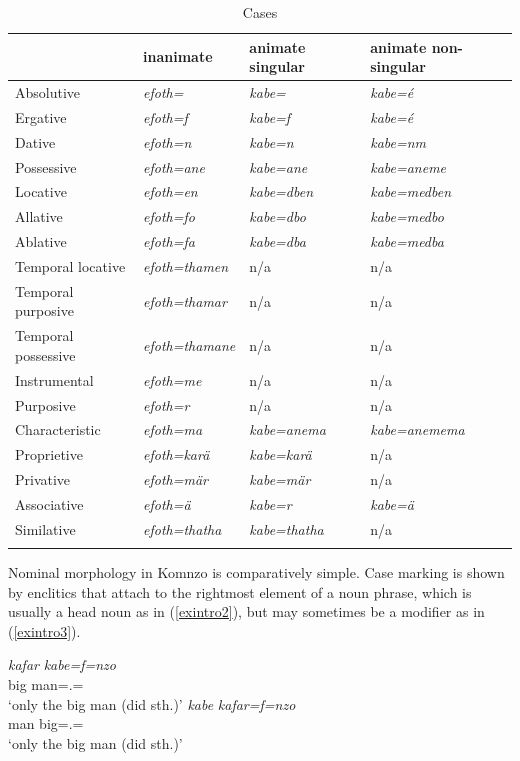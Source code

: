 \begin{table}
\caption{Cases}
\label{tab-01-case}
	\begin{tabularx}{\textwidth}{Xlll}
	\lsptoprule
		&inanimate&animate singular& animate non-singular\\
		\midrule 
		Absolutive&\emph{efoth=\Zero}&\emph{kabe=\Zero}&\emph{kabe=é}\\
		Ergative&\emph{efoth=f}&\emph{kabe=f}&\emph{kabe=é}\\
		Dative&\emph{efoth=n}&\emph{kabe=n}&\emph{kabe=nm}\\
		Possessive&\emph{efoth=ane}&\emph{kabe=ane}&\emph{kabe=aneme}\\
		Locative&\emph{efoth=en}&\emph{kabe=dben}&\emph{kabe=medben}\\
		Allative&\emph{efoth=fo}&\emph{kabe=dbo}&\emph{kabe=medbo}\\
		Ablative&\emph{efoth=fa}&\emph{kabe=dba}&\emph{kabe=medba}\\
		Temporal locative&\emph{efoth=thamen}&n/a&n/a\\
		Temporal purposive&\emph{efoth=thamar}&n/a&n/a\\
		Temporal possessive&\emph{efoth=thamane}&n/a&n/a\\
		Instrumental&\emph{efoth=me}&n/a&n/a\\
		Purposive&\emph{efoth=r}&n/a&n/a\\
		Characteristic&\emph{efoth=ma}&\emph{kabe=anema}&\emph{kabe=anemema}\\
		Proprietive&\emph{efoth=karä}&\emph{kabe=karä}&n/a\\
		Privative&\emph{efoth=mär}&\emph{kabe=mär}&n/a\\
		Associative\super{a}&\emph{efoth=ä}&\emph{kabe=r}&\emph{kabe=ä}\\
		Similative&\emph{efoth=thatha}&\emph{kabe=thatha}&n/a\\
	\lspbottomrule
		\multicolumn{4}{l}{\footnotesize \super{a}The associative forms encode {\Du} versus {\Pl} (\S\ref{inclusorycontruction}).}
	\end{tabularx}
\end{table}%

Nominal morphology in Komnzo is comparatively simple. Case marking is shown by enclitics that attach to the rightmost element of a noun phrase, which is usually a head noun as in (\ref{exintro2}), but may sometimes be a modifier as in (\ref{exintro3}).

\begin{exe}
	\ex \label{exintro}
	\begin{xlist}
		\ex
		\gll \emph{kafar} \emph{kabe=f=nzo}\\
		big man=\Erg.\Sg=\Only\\
		\trans `only the big man (did sth.)'
		\label{exintro2}
		\ex
		\gll \emph{kabe} \emph{kafar=f=nzo}\\
		man big=\Erg.\Sg=\Only\\
		\trans `only the big man (did sth.)'
		\label{exintro3}
	\end{xlist}
\end{exe}

